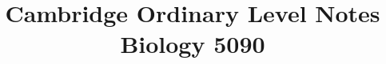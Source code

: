 \documentclass{article}
\title{Cambridge Ordinary Level Notes \\ Biology 5090}
\begin{document}
\maketitle{}\newpage\tableofcontents




\end{document}
